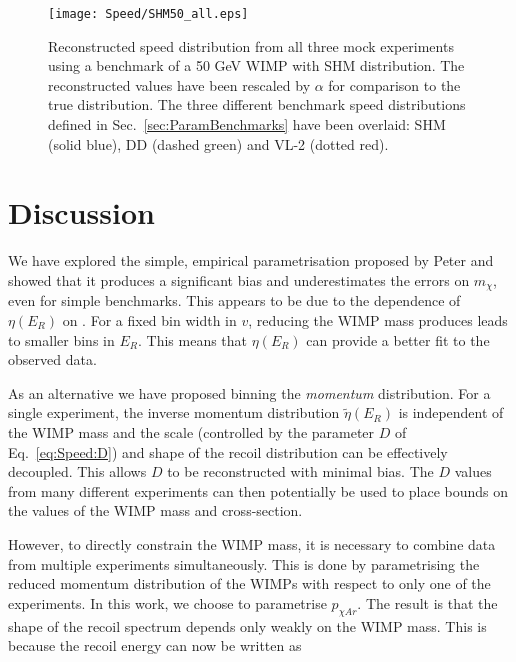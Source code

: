  \begin{figure}[t]
\centering
\texttt{[image: Speed/SHM50\_all.eps]}
\caption[Reconstructed speed distribution from all three mock experiments for a 50 GeV WIMP with SHM distribution. All three benchmark distributions are shown for comparison.]{Reconstructed speed distribution from all three mock experiments using a benchmark of a 50 GeV WIMP with SHM distribution. The reconstructed values have been rescaled by \(\alpha\) for comparison to the true distribution. The three different benchmark speed distributions defined in Sec.\ \ref{sec:ParamBenchmarks} have been overlaid: SHM (solid blue), DD (dashed green) and VL-2 (dotted red).}
  \label{fig:Speed:SHM50_all}
\end{figure}



\section{Discussion}
\label{sec:Speed:discussion}
We have explored the simple, empirical parametrisation proposed by Peter and showed that it produces a significant bias and underestimates the errors on $m_\chi$, even for simple benchmarks.  This appears to be due to the dependence of $\eta(E_R)$ on \mchi. For a fixed bin width in $v$, reducing the WIMP mass produces leads to smaller bins in $E_R$. This means that $\eta(E_R)$ can provide a better fit to the observed data.

As an alternative we have proposed binning the \textit{momentum} distribution. For a single experiment, the inverse momentum distribution $\tilde{\eta}(E_R)$ is independent of the WIMP mass and the scale (controlled by the parameter $D$ of Eq.~\ref{eq:Speed:D}) and shape of the recoil distribution can be effectively decoupled. This allows $D$ to be reconstructed with minimal bias. The $D$ values from many different experiments can then potentially be used to place bounds on the values of the WIMP mass and cross-section.

However, to directly constrain the WIMP mass, it is necessary to combine data from multiple experiments simultaneously. This is done by parametrising the reduced momentum distribution of the WIMPs with respect to only one of the experiments. In this work, we choose to parametrise $p_{\chi Ar}$. The result is that the shape of the recoil spectrum depends only weakly on the WIMP mass. This is because the recoil energy can now be written as

